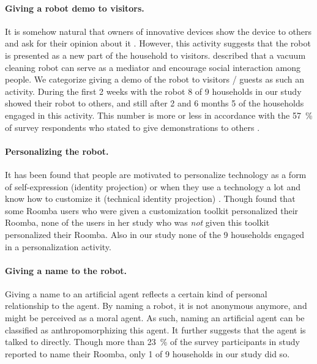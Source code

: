 \documentclass{frontiersSCNS} %
\begin{document}
\paragraph*{Giving a robot demo to visitors.} It is somehow natural that owners of innovative devices show the device to others and ask for their opinion about it \citep{rogers_diffusion_1995}. However, this activity suggests that the robot is presented as a new part of the household to visitors. \cite{sung_domestic_2010} described that a vacuum cleaning robot can serve as a mediator and encourage social interaction among people. We categorize giving a demo of the robot to visitors / guests as such an activity. During the first 2 weeks with the robot 8 of 9 households in our study showed their robot to others, and still after 2 and 6 months 5 of the households engaged in this activity. This number is more or less in accordance with the 57~\% of survey respondents who stated to give demonstrations to others \citep{sung_housewives_2008}.


\paragraph*{Personalizing the robot.} It has been found that people are motivated to personalize technology as a form of self-expression (identity projection) or when they use a technology a lot and know how to customize it (technical identity projection) \citep{blom_personalization:_2000}. Though \cite{sung_pimp_2009} found that some Roomba users who were given a customization toolkit personalized their Roomba, none of the users in her study who was \textit{not} given this toolkit personalized their Roomba. Also in our study none of the 9 households engaged in a personalization activity.

\paragraph*{Giving a name to the robot.} Giving a name to an artificial agent reflects a certain kind of personal relationship to the agent. By naming a robot, it is not anonymous anymore, and might be perceived as a moral agent. As such, naming an artificial agent can be classified as anthropomorphizing this agent. It further suggests that the agent is talked to directly. Though more than 23~\% of the survey participants in \cite{sung_housewives_2008} study reported to name their Roomba, only 1 of 9 households in our study did so. 
\end{document}
